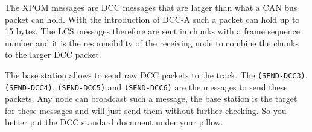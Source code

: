 \begin{table}[ht!]
    \centering 
\end{table}

The XPOM messages are DCC messages that are larger than what a CAN bus packet can hold. With the introduction of DCC-A such a packet can hold up to 15 bytes. The LCS messages therefore are sent in chunks with a frame sequence number and it is the responsibility of the receiving node to combine the chunks to the larger DCC packet.


The base station allows to send raw DCC packets to the track. The \texttt{(SEND-DCC3)}, \texttt{(SEND-DCC4)}, \texttt{(SEND-DCC5)} and \texttt{(SEND-DCC6)} are the messages to send these packets. Any node can broadcast such a message, the base station is the target for these messages and will just send them without further checking. So you better put the DCC standard document under your pillow.

\begin{table}[ht!]
    \centering 
\end{table}

